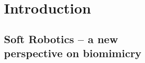 \documentclass[final,thumbmain]{thesis}  %
\author{Brandon Jonathan Caasenbrood}
\begin{document}



 



\cleardoublepage
{}

\tableofcontents
\newpage

\isstarredchapterfalse
\cleardoublepage
\thispagestyle{empty}
\label{chap: intro}
\setcounter{page}{1}

\part{Introduction}\label{part: intro}
\chapter[Soft robotics -- a new perspective]{Soft Robotics -- a new \\ perspective on biomimicry}
\label{chap: introduction}
\vspace*{-12mm}








% 
% 
% 
% 
% 
\end{document}
